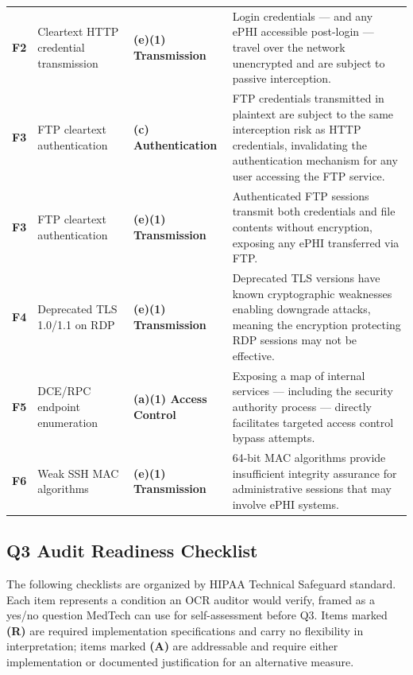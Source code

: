 \documentclass[12pt]{article}
\newcommand{\hipbadge}[2]{%
  \colorbox{#1}{\color{white}\textbf{\small #2}}%
}
\begin{document}
\begin{longtable}{>{\bfseries}p{0.8cm} p{3.6cm} p{4.5cm} p{3.8cm}}
  F2 &
  Cleartext HTTP credential transmission &
  \hipbadge{transcol}{(e)(1) Transmission} &
  Login credentials --- and any ePHI accessible post-login --- travel
  over the network unencrypted and are subject to passive interception.
  \\[4pt]
 
  F3 &
  FTP cleartext authentication &
  \hipbadge{authcol}{(c) Authentication} &
  FTP credentials transmitted in plaintext are subject to the same
  interception risk as HTTP credentials, invalidating the authentication
  mechanism for any user accessing the FTP service. \\[4pt]
 
  F3 &
  FTP cleartext authentication &
  \hipbadge{transcol}{(e)(1) Transmission} &
  Authenticated FTP sessions transmit both credentials and file contents
  without encryption, exposing any ePHI transferred via FTP. \\[4pt]
 
  F4 &
  Deprecated TLS 1.0/1.1 on RDP &
  \hipbadge{transcol}{(e)(1) Transmission} &
  Deprecated TLS versions have known cryptographic weaknesses enabling
  downgrade attacks, meaning the encryption protecting RDP sessions may
  not be effective. \\[4pt]
 
  F5 &
  DCE/RPC endpoint enumeration &
  \hipbadge{acccol}{(a)(1) Access Control} &
  Exposing a map of internal services --- including the security authority
  process --- directly facilitates targeted access control bypass attempts.
  \\[4pt]
 
  F6 &
  Weak SSH MAC algorithms &
  \hipbadge{transcol}{(e)(1) Transmission} &
  64-bit MAC algorithms provide insufficient integrity assurance for
  administrative sessions that may involve ePHI systems. \\[4pt]
 
  \bottomrule
\end{longtable}
 
\subsection{Q3 Audit Readiness Checklist}
 
The following checklists are organized by HIPAA Technical Safeguard standard.
Each item represents a condition an OCR auditor would verify, framed as a
yes/no question MedTech can use for self-assessment before Q3. Items marked
\textbf{(R)} are required implementation specifications and carry no
flexibility in interpretation; items marked \textbf{(A)} are addressable and
require either implementation or documented justification for an alternative
measure.
 
\end{document}
